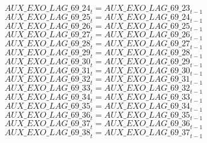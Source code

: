 \begin{dmath}
{AUX\_EXO\_LAG\_69\_24}_{t}={AUX\_EXO\_LAG\_69\_23}_{t-1}
\end{dmath}
\begin{dmath}
{AUX\_EXO\_LAG\_69\_25}_{t}={AUX\_EXO\_LAG\_69\_24}_{t-1}
\end{dmath}
\begin{dmath}
{AUX\_EXO\_LAG\_69\_26}_{t}={AUX\_EXO\_LAG\_69\_25}_{t-1}
\end{dmath}
\begin{dmath}
{AUX\_EXO\_LAG\_69\_27}_{t}={AUX\_EXO\_LAG\_69\_26}_{t-1}
\end{dmath}
\begin{dmath}
{AUX\_EXO\_LAG\_69\_28}_{t}={AUX\_EXO\_LAG\_69\_27}_{t-1}
\end{dmath}
\begin{dmath}
{AUX\_EXO\_LAG\_69\_29}_{t}={AUX\_EXO\_LAG\_69\_28}_{t-1}
\end{dmath}
\begin{dmath}
{AUX\_EXO\_LAG\_69\_30}_{t}={AUX\_EXO\_LAG\_69\_29}_{t-1}
\end{dmath}
\begin{dmath}
{AUX\_EXO\_LAG\_69\_31}_{t}={AUX\_EXO\_LAG\_69\_30}_{t-1}
\end{dmath}
\begin{dmath}
{AUX\_EXO\_LAG\_69\_32}_{t}={AUX\_EXO\_LAG\_69\_31}_{t-1}
\end{dmath}
\begin{dmath}
{AUX\_EXO\_LAG\_69\_33}_{t}={AUX\_EXO\_LAG\_69\_32}_{t-1}
\end{dmath}
\begin{dmath}
{AUX\_EXO\_LAG\_69\_34}_{t}={AUX\_EXO\_LAG\_69\_33}_{t-1}
\end{dmath}
\begin{dmath}
{AUX\_EXO\_LAG\_69\_35}_{t}={AUX\_EXO\_LAG\_69\_34}_{t-1}
\end{dmath}
\begin{dmath}
{AUX\_EXO\_LAG\_69\_36}_{t}={AUX\_EXO\_LAG\_69\_35}_{t-1}
\end{dmath}
\begin{dmath}
{AUX\_EXO\_LAG\_69\_37}_{t}={AUX\_EXO\_LAG\_69\_36}_{t-1}
\end{dmath}
\begin{dmath}
{AUX\_EXO\_LAG\_69\_38}_{t}={AUX\_EXO\_LAG\_69\_37}_{t-1}
\end{dmath}
